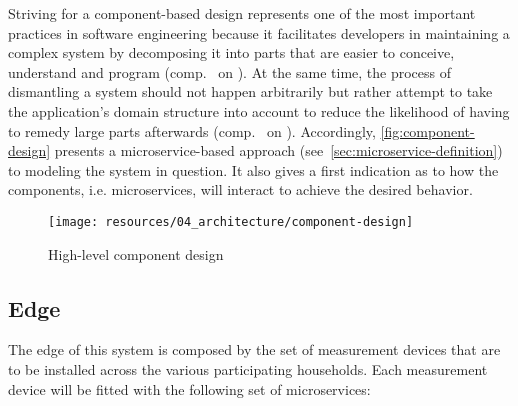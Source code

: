 Striving for a component-based design represents one of the most important practices in software engineering because it facilitates developers in maintaining a complex system by decomposing it into parts that are easier to conceive, understand and program (comp.~ on ). At the same time, the process of dismantling a system should not happen arbitrarily but rather attempt to take the application's domain structure into account to reduce the likelihood of having to remedy large parts afterwards (comp.~ on ).  Accordingly, \autoref{fig:component-design} presents a microservice-based approach (see~\autoref{sec:microservice-definition}) to modeling the system in question. It also gives a first indication as to how the components, i.e. microservices, will interact to achieve the desired behavior.

\begin{figure}[hbt]
  \centering
  \texttt{[image: resources/04\_architecture/component-design]}
  \caption{High-level component design}
  \label{fig:component-design}
\end{figure}

\FloatBarrier


\subsection{Edge}
\label{sec:component-design-edge}

The edge of this system is composed by the set of measurement devices that are to be installed across the various participating households. Each measurement device will be fitted with the following set of microservices:

